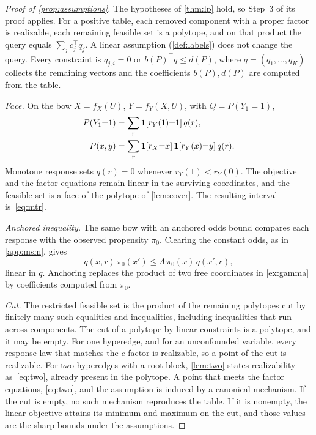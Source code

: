 \begin{proof}[Proof of \cref{prop:assumptions}]
The hypotheses of \cref{thm:lp} hold, so Step~3 of its proof applies. For a positive table, each removed component with a proper factor is realizable, each remaining feasible set is a polytope, and on that product the query equals $\sum_j c_j^\top q_j$. A linear assumption (\cref{def:labels}) does not change the query. Every constraint is $q_{j,i}=0$ or $b(P)^\top q\le d(P)$, where $q=(q_1,\ldots,q_K)$ collects the remaining vectors and the coefficients $b(P),d(P)$ are computed from the table.

\emph{Face.} On the bow $X=f_X(U)$, $Y=f_Y(X,U)$, with $Q=P(Y_1{=}1)$,
\begin{align*}
P(Y_1{=}1)
&=
\sum_r \mathbf{1}[r_Y(1){=}1]\,q(r),
\\
P(x,y)
&=
\sum_r \mathbf{1}[r_X{=}x]\,\mathbf{1}[r_Y(x){=}y]\,q(r).
\end{align*}
Monotone response sets $q(r)=0$ whenever $r_Y(1)<r_Y(0)$. The objective and the factor equations remain linear in the surviving coordinates, and the feasible set is a face of the polytope of \cref{lem:cover}. The resulting interval is~\eqref{eq:mtr}.

\emph{Anchored inequality.} The same bow with an anchored odds bound compares each response with the observed propensity $\pi_0$. Clearing the constant odds, as in \cref{app:msm}, gives
\[
q(x,r)\,\pi_0(x')
\le
\Lambda\,\pi_0(x)\,q(x',r),
\]
linear in $q$. Anchoring replaces the product of two free coordinates in \cref{ex:gamma} by coefficients computed from $\pi_0$.

\emph{Cut.} The restricted feasible set is the product of the remaining polytopes cut by finitely many such equalities and inequalities, including inequalities that run across components. The cut of a polytope by linear constraints is a polytope, and it may be empty. For one hyperedge, and for an unconfounded variable, every response law that matches the $c$-factor is realizable, so a point of the cut is realizable. For two hyperedges with a root block, \cref{lem:two} states realizability as~\eqref{eq:two}, already present in the polytope. A point that meets the factor equations, \eqref{eq:two}, and the assumption is induced by a canonical mechanism. If the cut is empty, no such mechanism reproduces the table. If it is nonempty, the linear objective attains its minimum and maximum on the cut, and those values are the sharp bounds under the assumptions.
\end{proof}

